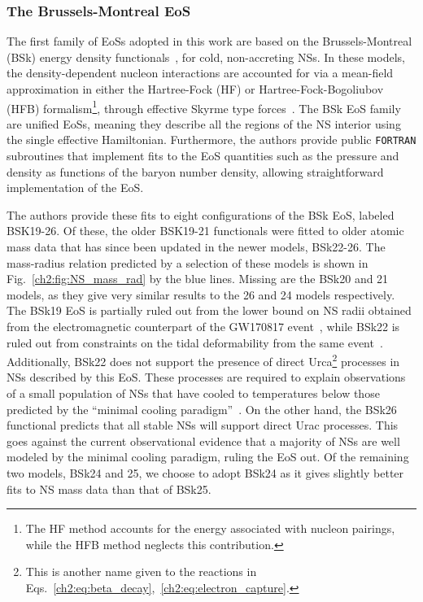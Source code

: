 \subsubsection{The Brussels-Montreal EoS}
The first family of EoSs adopted in this work are based on the Brussels-Montreal (BSk) energy density functionals~\cite{Chamel:2009yx_FurtherexplorationsSkyrmeHartreeFockBogoliubov, Goriely:2010bm_FurtherexplorationsSkyrmeHartreeFockBogoliubov, Pearson:2011zz_jun_Propertiesoutercrust, Pearson:2012hz_Innercrustneutron, Potekhin:2013qqa_Analyticalrepresentationsunified, Pearson:2018tkr_Unifiedequationsstate}, for cold, non-accreting NSs. In these models, the density-dependent nucleon interactions are accounted for via a mean-field approximation in either the Hartree-Fock (HF) or Hartree-Fock-Bogoliubov (HFB) formalism\footnote{The HF method accounts for the energy associated with nucleon pairings, while the HFB method neglects this contribution.}, through effective Skyrme type forces~\cite{Bender:2003jk_Selfconsistentmeanfieldmodels, Stone:2006fn_Skyrmeinteractionfinite}. The BSk EoS family are unified EoSs, meaning they describe all the regions of the NS interior using the single effective Hamiltonian. Furthermore, the authors provide public \texttt{FORTRAN} subroutines that implement fits to the EoS quantities such as the pressure and density as functions of the baryon number density, allowing straightforward implementation of the EoS. 

The authors provide these fits to eight configurations of the BSk EoS, labeled BSK19-26. Of these, the older BSK19-21  functionals were fitted to older atomic mass data that has since been updated in the newer models, BSk22-26. The mass-radius relation predicted by a selection of these models is shown in Fig.~\ref{ch2:fig:NS_mass_rad} by the blue lines. Missing are the BSk20 and 21 models, as they give very similar results to the 26 and 24 models respectively. The BSk19 EoS is partially ruled out from the lower bound on NS radii obtained from the electromagnetic counterpart of the GW170817 event~\cite{Koppel:2019pys_Generalrelativisticdeterminationthreshold}, while BSk22 is ruled out from constraints on the tidal deformability from the same event~\cite{Perot:2019gwl_Rolesymmetryenergy}. Additionally, BSk22 does not support the presence of direct Urca\footnote{This is another name given to the reactions in Eqs.~\ref{ch2:eq:beta_decay},~\ref{ch2:eq:electron_capture}.} processes in NSs described by this EoS. These processes are required to explain observations of a small population of NSs that have cooled to temperatures below those predicted by the ``minimal cooling paradigm''~\cite{Gusakov:2004se_Enhancedcoolingneutron, Page:2004fy_MinimalCoolingNeutron}. On the other hand, the BSk26 functional predicts that all stable NSs will support direct Urac processes. This goes against the current observational evidence that a majority of NSs are well modeled by the minimal cooling paradigm, ruling the EoS out. Of the remaining two models, BSk24 and 25, we choose to adopt BSk24 as it gives slightly better fits to NS mass data than that of BSk25. 

